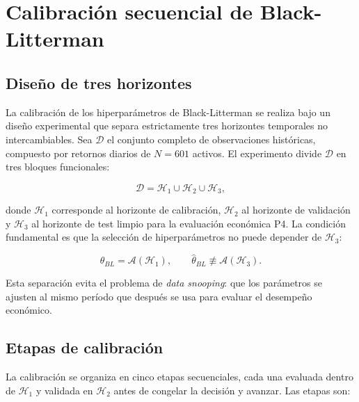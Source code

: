 \section{Calibraci\'on secuencial de Black-Litterman}

\subsection{Dise\~no de tres horizontes}

La calibraci\'on de los hiperpar\'ametros de Black-Litterman se realiza bajo
un dise\~no experimental que separa estrictamente tres horizontes temporales
no intercambiables. Sea $\mathcal{D}$ el conjunto completo de observaciones
hist\'oricas, compuesto por retornos diarios de $N = 601$ activos. El
experimento divide $\mathcal{D}$ en tres bloques funcionales:

\begin{equation}
\mathcal{D} = \mathcal{H}_1 \cup \mathcal{H}_2 \cup \mathcal{H}_3,
\end{equation}

donde $\mathcal{H}_1$ corresponde al horizonte de calibraci\'on,
$\mathcal{H}_2$ al horizonte de validaci\'on y $\mathcal{H}_3$ al horizonte de
test limpio para la evaluaci\'on econ\'omica P4. La condici\'on fundamental es
que la selecci\'on de hiperpar\'ametros no puede depender de $\mathcal{H}_3$:

\begin{equation}
\widehat{\theta}_{BL} = \mathcal{A}(\mathcal{H}_1), \qquad
\widehat{\theta}_{BL} \not\equiv \mathcal{A}(\mathcal{H}_3).
\end{equation}

Esta separaci\'on evita el problema de \textit{data snooping}: que los
par\'ametros se ajusten al mismo per\'iodo que despu\'es se usa para evaluar
el desempe\~no econ\'omico.

\subsection{Etapas de calibraci\'on}

La calibraci\'on se organiza en cinco etapas secuenciales, cada una evaluada
dentro de $\mathcal{H}_1$ y validada en $\mathcal{H}_2$ antes de congelar la
decisi\'on y avanzar. Las etapas son:

